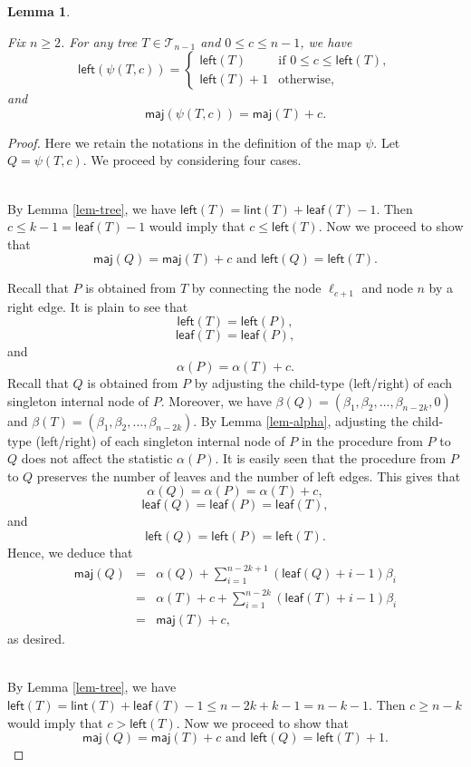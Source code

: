\documentclass[12pt]{article}
\numberwithin{equation}{section}
\theoremstyle{plain}
\newtheorem{lemma}[theorem]{Lemma}
\def\maj{\mathsf{maj}}
\def\l{\mathsf{left}}
\def\l{\mathsf{left}}
\def\lint{\mathsf{lint}}
\def\B{\mathcal{T}}
\def\leaf{\mathsf{leaf}}
\begin{document}
	 	\begin{lemma}\label{lem-psi-1}
	 		
	 	Fix $n\geq 2$. 	For  any tree $T\in \B_{n-1}$ and $0\le c\le n-1$, we have
	 		\[
	 		\l(\psi(T, c))=\left\{ 
	 		\begin{array}{ll}
	 			\l(T) & \mbox{if  $0\leq c\leq \l(T)$},\\[2pt]
	 			\l(T)+1 & \mbox{otherwise},
	 		\end{array}
	 		\right.
	 		\]
	 		and
	 		\[
	 		\maj(\psi(T, c))=\maj(T)+c.
	 		\]
	 		\end{lemma}
	 		\begin{proof}
	 			Here we retain the notations in the definition of the map $\psi$. Let $Q=\psi(T,c)$.   We proceed  by considering  four cases.
	 			
	 			\\
	 			By Lemma \ref{lem-tree}, we have $\l(T)=\lint(T)+\leaf(T)-1$.  Then $c\leq k-1=\leaf(T)-1$ would imply that $c\leq \l(T)$.  Now we proceed to show that 
	 			$$
	 			\maj(Q)=\maj(T)+c \,\, \mbox{and}\,\, \l(Q)=\l(T).
	 			$$
	 		 
	 			Recall that $P$ is obtained from $T$ by connecting the node $\ell_{c+1}$ and node $n$ by a right edge.  It is plain to see that $$\l(T)=\l(P),$$ $$\leaf(T)=\leaf(P),$$   and $$\alpha(P)=\alpha(T)+c.$$  
	 			Recall that $Q$ is obtained from $P$ by adjusting the child-type (left/right)   of each singleton internal node of $P$.  Moreover, we have  $\beta(Q)=(\beta_1, \beta_2, \ldots, \beta_{n-2k}, 0)$ and $\beta(T)=(\beta_1, \beta_2, \ldots, \beta_{n-2k})$.  By Lemma \ref{lem-alpha},   adjusting the child-type (left/right)   of each singleton internal node of $P$ in the procedure from $P$ to $Q$ does not affect the statistic $\alpha(P)$.   It is easily seen that the procedure from $P$ to $Q$ preserves the number of leaves and the number of left edges. This gives that  $$\alpha(Q)=\alpha(P)=\alpha(T)+c,$$
	 			 $$\leaf(Q)=\leaf(P)=\leaf(T),$$
	 			 and $$\l(Q)=\l(P)=\l(T).
	 			 $$
	 			  Hence, we deduce that
	 			 $$
	 			 \begin{array}{lll}
	 			 \maj(Q)&=&\alpha(Q)+\sum\limits_{i=1}^{n-2k+1}(\leaf(Q)+i-1)\beta_i\\
	 			 &=&\alpha(T)+c+\sum\limits_{i=1}^{n-2k}(\leaf(T)+i-1)\beta_i\\
	 			 &=& \maj(T)+c,
	 			 \end{array}
	 			 $$
	 			as desired.
	 			
	 		 
	 		 	\\
	 		 By Lemma \ref{lem-tree}, we have $\l(T)=\lint(T)+\leaf(T)-1\leq n-2k+k-1=n-k-1$.  Then $c\geq n-k$ would imply that $c> \l(T)$.  Now we proceed to show that 
	 		 $$
	 		 \maj(Q)=\maj(T)+c \,\, \mbox{and}\,\, \l(Q)=\l(T)+1.
	 		 $$
	 		 

\end{proof}
\end{document}
